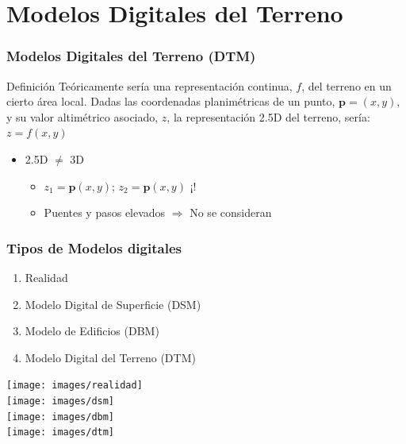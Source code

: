 \section[DTM]{Modelos Digitales del Terreno}
\begin{frame}
  \frametitle{Modelos Digitales del Terreno (DTM)}
  \begin{beamerboxesrounded}[shadow=true]{Definición}
    Teóricamente sería una representación continua, $f$, del terreno en un
    cierto área local. Dadas las coordenadas planimétricas de un punto,
    $\mathbf{p}=(x,y)$, y su valor altimétrico asociado, $z$, la representación
    \alert{2.5D} del terreno, sería: $z=f(x,y)$
  \end{beamerboxesrounded}
  \begin{itemize}
    \item \alert{2.5D $\ne$ 3D}
      \begin{itemize}
        \item $z_1 = \mathbf{p}(x,y)$; $z_2 = \mathbf{p}(x,y)$ \alert{¡!}
        \item Puentes y pasos elevados $\Rightarrow$ \alert{No se consideran}
      \end{itemize}
  \end{itemize}
\end{frame}
\begin{frame}
  \frametitle{Tipos de Modelos digitales}
  \begin{minipage}{.4\textwidth}
  \begin{enumerate}
    \item Realidad
    \item Modelo Digital de Superficie (DSM)
    \item Modelo de Edificios (DBM)
    \item Modelo Digital del Terreno (DTM)
  \end{enumerate}
  \end{minipage}
  \begin{minipage}{.55\textwidth}
    \texttt{[image: images/realidad]}\\
    \texttt{[image: images/dsm]}\\
    \texttt{[image: images/dbm]}\\
    \texttt{[image: images/dtm]}
  \end{minipage}
\end{frame}
